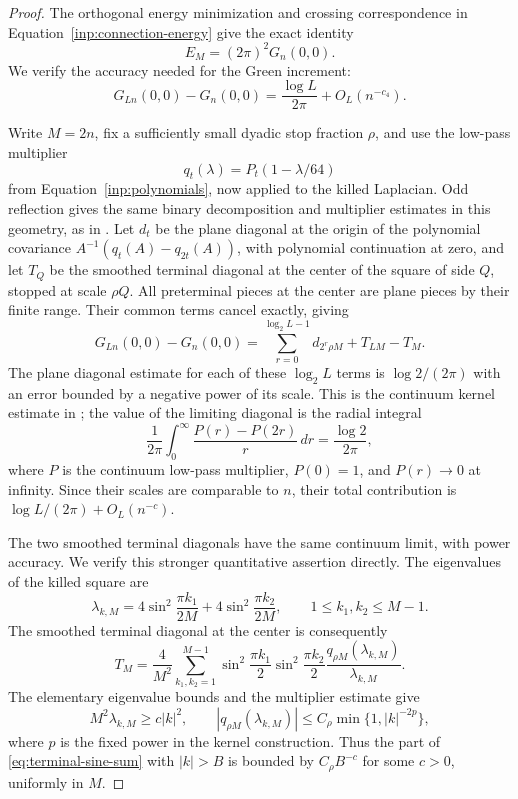 \begin{proof}
The orthogonal energy minimization and crossing correspondence in
Equation~\eqref{inp:connection-energy} give the exact identity
\begin{equation}
                E_M=(2\pi)^2G_n(0,0).
 \label{eq:terminal-green-energy}
\end{equation}
We verify the accuracy needed for the Green increment:
\begin{equation}
 G_{Ln}(0,0)-G_n(0,0)
       =\frac{\log L}{2\pi}+O_L(n^{-c_4}).
 \label{eq:terminal-green-increment}
\end{equation}

Write $M=2n$, fix a sufficiently small dyadic stop fraction $\rho$,
and use the low-pass multiplier
\[
                    q_t(\lambda)=P_t(1-\lambda/64)
\]
from Equation~\eqref{inp:polynomials}, now applied to the killed
Laplacian.  Odd reflection gives the same binary decomposition and
multiplier estimates in this geometry, as in
\cite[Lemmas 4.1 and 4.2]{B}.
Let $d_t$ be the plane diagonal at the origin of the polynomial
covariance $A^{-1}(q_t(A)-q_{2t}(A))$, with polynomial continuation
at zero, and let $T_Q$ be the smoothed terminal diagonal at the center
of the square of side $Q$, stopped at scale $\rho Q$.
All preterminal pieces at the center are plane pieces by their finite
range.  Their common terms cancel exactly, giving
\begin{equation}
 G_{Ln}(0,0)-G_n(0,0)
   =\sum_{r=0}^{\log_2L-1}d_{2^r\rho M}+T_{LM}-T_M.
 \label{eq:terminal-green-telescope}
\end{equation}
The plane diagonal estimate for each of these $\log_2L$ terms is
$\log2/(2\pi)$ with an error bounded by a negative power of its
scale.  This is the continuum kernel estimate in
\cite[Lemma 8.1]{B}; the value of the limiting diagonal is
the radial integral
\[
 \frac1{2\pi}\int_0^\infty
      \frac{P(r)-P(2r)}r\,dr=\frac{\log2}{2\pi},
\]
where $P$ is the continuum low-pass multiplier, $P(0)=1$, and
$P(r)\to0$ at infinity.  Since their scales are comparable to
$n$, their total contribution is
$\log L/(2\pi)+O_L(n^{-c})$.

The two smoothed terminal diagonals have the same continuum limit,
with power accuracy.  We verify this stronger quantitative assertion
directly.  The eigenvalues of the killed square are
\[
 \lambda_{k,M}
   =4\sin^2\frac{\pi k_1}{2M}
       +4\sin^2\frac{\pi k_2}{2M},
 \qquad 1\leq k_1,k_2\leq M-1.
\]
The smoothed terminal diagonal at the center is consequently
\begin{equation}
 T_M=\frac4{M^2}
     \sum_{k_1,k_2=1}^{M-1}
     \sin^2\frac{\pi k_1}{2}\sin^2\frac{\pi k_2}{2}
     \frac{q_{\rho M}(\lambda_{k,M})}{\lambda_{k,M}}.
 \label{eq:terminal-sine-sum}
\end{equation}
The elementary eigenvalue bounds and the multiplier estimate give
\[
 M^2\lambda_{k,M}\geq c|k|^2,
 \qquad
 |q_{\rho M}(\lambda_{k,M})|
       \leq C_\rho\min\{1,|k|^{-2p}\},
\]
where $p$ is the fixed power in the kernel construction.  Thus the
part of \eqref{eq:terminal-sine-sum} with $|k|>B$ is bounded by
$C_\rho B^{-c}$ for some $c>0$, uniformly in $M$.


\end{proof}
